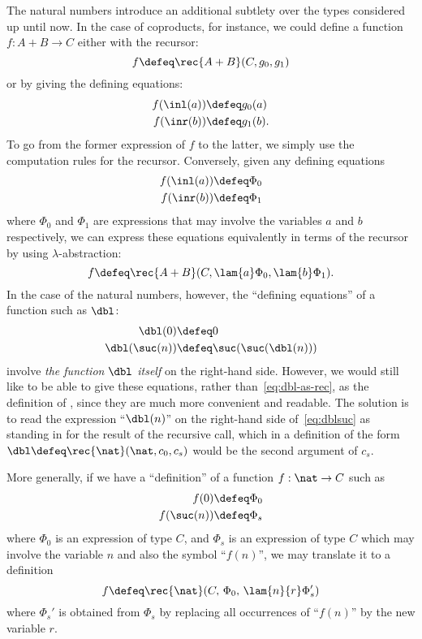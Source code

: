 %
%
%
The natural numbers introduce an additional subtlety over the types considered up until now.
In the case of coproducts, for instance, we could define a function $f:A+B\to C$ either with the recursor:
\[ f \defeq \rec{A+B}(C, g_0, g_1) \]
or by giving the defining equations:
\begin{align*}
  f(\inl(a)) &\defeq g_0(a)\\
  f(\inr(b)) &\defeq g_1(b).
\end{align*}
To go from the former expression of $f$ to the latter, we simply use the computation rules for the recursor.
Conversely, given any defining equations
\begin{align*}
  f(\inl(a)) &\defeq \Phi_0\\
  f(\inr(b)) &\defeq \Phi_1
\end{align*}
where $\Phi_0$ and $\Phi_1$ are expressions that may involve the variables
%
$a$ and $b$ respectively, we can express these equations equivalently in terms of the recursor by using $\lambda$-abstraction:
\[ f\defeq \rec{A+B}(C, \lam{a} \Phi_0, \lam{b} \Phi_1).\]
In the case of the natural numbers, however, the ``defining equations'' of a function such as $\dbl$:
\begin{align}
  \dbl(0) &\defeq 0 \label{eq:dbl0}\\
  \dbl(\suc(n)) &\defeq \suc(\suc(\dbl(n)))\label{eq:dblsuc}
\end{align}
involve \emph{the function $\dbl$ itself} on the right-hand side.
However, we would still like to be able to give these equations, rather than~\eqref{eq:dbl-as-rec}, as the definition of \dbl, since they are much more convenient and readable.
The solution is to read the expression ``$\dbl(n)$'' on the right-hand side of~\eqref{eq:dblsuc} as standing in for the result of the recursive call, which in a definition of the form $\dbl\defeq \rec{\nat}(\nat,c_0,c_s)$ would be the second argument of $c_s$.

More generally, if we have a ``definition'' of a function $f:\nat\to C$ such as
\begin{align*}
  f(0) &\defeq \Phi_0\\
  f(\suc(n)) &\defeq \Phi_s
\end{align*}
where $\Phi_0$ is an expression of type $C$, and $\Phi_s$ is an expression of type $C$ which may involve the variable $n$ and also the symbol ``$f(n)$'', we may translate it to a definition
\[ f \defeq \rec{\nat}(C,\,\Phi_0,\,\lam{n}{r} \Phi_s') \]
where $\Phi_s'$ is obtained from $\Phi_s$ by replacing all occurrences of ``$f(n)$'' by the new variable $r$.

